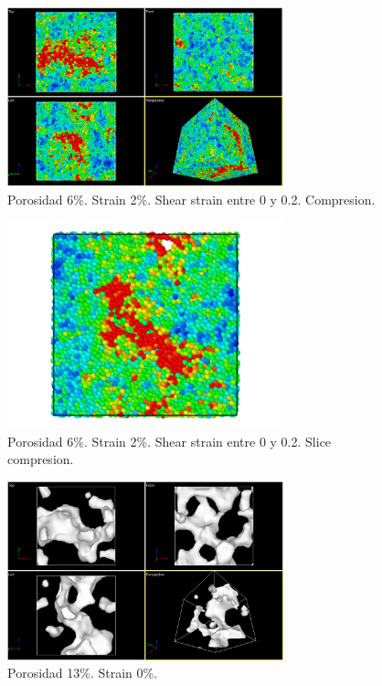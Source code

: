 \documentclass[10pt, oneside]{article} %
\begin{document}
\begin{figure}[H]
\centering
\includegraphics[width=8cm]{Figures/Porosidad/porosidad_6_muestra_2strain_color_0_02.png}
\caption{Porosidad 6\%. Strain 2\%. Shear strain entre 0 y 0.2. Compresion.}
\end{figure}

\begin{figure}[H]
\centering
\includegraphics[width=8cm]{Figures/Porosidad/porosidad_6_muestra_2strain_color_slice_0_02.png}
\caption{Porosidad 6\%. Strain 2\%. Shear strain entre 0 y 0.2. Slice compresion.}
\end{figure}

\begin{figure}[H]
\centering
\includegraphics[width=8cm]{Figures/Porosidad/porosidad_13_muestra_0strain.png}
\caption{Porosidad 13\%. Strain 0\%.}
\end{figure}
\end{document}
